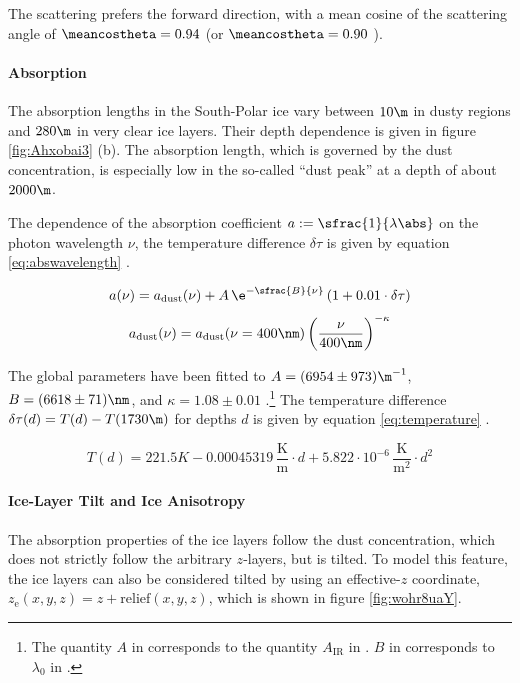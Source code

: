 The scattering prefers the forward direction, with a mean cosine of the scattering angle of $\meancostheta = 0.94$ \cite[paragraph 9]{ackermann} (or $\meancostheta = 0.90$ \cite{icepaper}).


\paragraph{Absorption}
The absorption lengths in the South-Polar ice vary between $10\m$ in dusty regions and $280\m$ in very clear ice layers. Their depth dependence is given in figure \ref{fig:Ahxobai3} (b). The absorption length, which is governed by the dust concentration, is especially low in the so-called ``dust peak'' at a depth of about $2000\m$. \cite{ackermann, ppcpaper, icepaper}

The dependence of the absorption coefficient $a := \sfrac{1}{\lambda\abs}$ on the photon wavelength $\nu$, the temperature difference $\delta\tau$ is given by equation \ref{eq:abswavelength} \cite{icepaper}.

\begin{equation}
  a(\nu) = a_\text{dust}(\nu) + A\,\e^{-\sfrac{B}{\nu}}\, (1 + 0.01 \cdot \delta\tau)
  \label{eq:abswavelength}
\end{equation}
\begin{equation}
  a_\text{dust}(\nu) = a_\text{dust}(\nu = 400\nm) \left(\frac{\nu}{400\nm}\right)^{-\kappa}
\end{equation}

The global parameters have been fitted to $A = (6954 \pm 973)\m^{-1}$, $B = (6618 \pm 71)\nm$, and $\kappa = 1.08 \pm 0.01$ \cite[section 5.2]{ackermann}.\footnote{The quantity $A$ in \cite{icepaper} corresponds to the quantity $A_\text{IR}$ in \cite{ackermann}. $B$ in \cite{icepaper} corresponds to $\lambda_0$ in \cite{ackermann}.}
The temperature difference $\delta\tau(d) = T(d) - T(1730\m)$ for depths $d$ is given by equation \ref{eq:temperature} \cite{icepaper}.

\begin{equation}
  T(d) = 221.5\unit{K} - 0.00045319\,\frac{\text{K}}{\text{m}}\cdot d + 5.822 \cdot 10^{-6}\,\frac{\text{K}}{\text{m}^2} \cdot d^2
  \label{eq:temperature}
\end{equation}


\paragraph{Ice-Layer Tilt and Ice Anisotropy}
The absorption properties of the ice layers follow the dust concentration, which does not strictly follow the arbitrary $z$-layers, but is tilted. To model this feature, the ice layers can also be considered tilted by using an effective-$z$ coordinate, $z_\text{e}(x,y,z) = z + \text{relief}(x,y,z)$, which is shown in figure \ref{fig:wohr8uaY}. \cite{icepaper}

